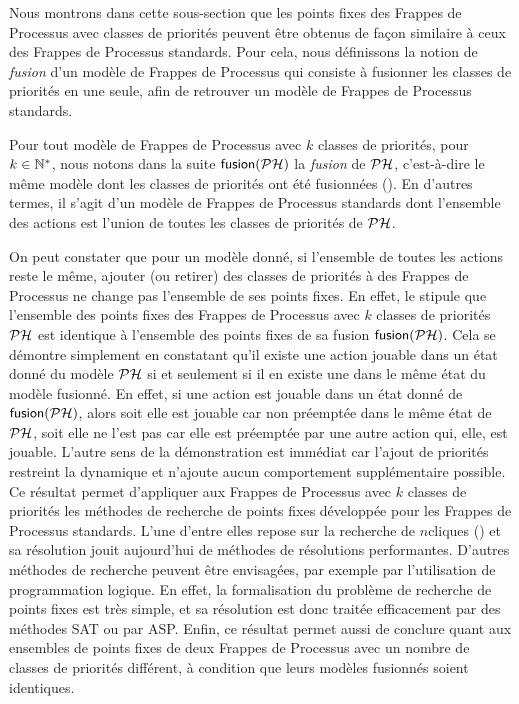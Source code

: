 Nous montrons dans cette sous-section que les points fixes des Frappes de Processus
avec classes de priorités peuvent être obtenus de façon similaire à ceux
des Frappes de Processus standards.
Pour cela, nous définissons la notion de \emph{fusion} d'un modèle de Frappes de Processus
qui consiste à fusionner les classes de priorités en une seule,
afin de retrouver un modèle de Frappes de Processus standards.

\myskip

Pour tout modèle de Frappes de Processus avec $k$ classes de priorités, pour $k \in \mathbb{N}^*$,
nous notons dans la suite $\mathsf{fusion}(\mathcal{PH})$
la \emph{fusion} de $\mathcal{PH}$,
c'est-à-dire le même modèle dont les classes de priorités ont été fusionnées
().
En d'autres termes, il s'agit d'un modèle de Frappes de Processus standards dont
l'ensemble des actions est l'union de toutes les classes de priorités de $\mathcal{PH}$.

On peut constater que pour un modèle donné, si l'ensemble de toutes les actions reste le même,
ajouter (ou retirer) des classes de priorités à des Frappes de Processus ne change pas
l'ensemble de ses points fixes.
En effet, le  stipule que
l'ensemble des points fixes des Frappes de Processus avec $k$
classes de priorités $\mathcal{PH}$ est identique à l'ensemble des points fixes de
sa fusion $\mathsf{fusion}(\mathcal{PH})$.
Cela se démontre simplement en constatant qu'il existe une action jouable dans un état donné du
modèle $\mathcal{PH}$ si et seulement si il en existe une dans le même état du modèle fusionné.
En effet, si une action est jouable dans un état donné de $\mathsf{fusion}(\mathcal{PH})$,
alors soit elle est jouable car non préemptée dans le même état de $\mathcal{PH}$,
soit elle ne l'est pas car elle est préemptée par une autre action qui, elle, est jouable.
L'autre sens de la démonstration est immédiat car l'ajout de priorités restreint la dynamique
et n'ajoute aucun comportement supplémentaire possible.
Ce résultat permet d'appliquer aux Frappes de Processus avec $k$ classes de priorités
les méthodes de recherche de points fixes développée pour les Frappes de Processus standards.
L'une d'entre elles repose sur la recherche de $n$\nbd cliques ()
et sa résolution jouit aujourd'hui de méthodes de résolutions performantes.
D'autres méthodes de recherche peuvent être envisagées,
par exemple par l'utilisation de programmation logique.
En effet, la formalisation du problème de recherche de points fixes est très simple,
et sa résolution est donc traitée efficacement par des méthodes SAT ou par ASP.
Enfin, ce résultat permet aussi de conclure quant aux ensembles de points fixes de deux Frappes
de Processus avec un nombre de classes de priorités différent, à condition que
leurs modèles fusionnés soient identiques.

